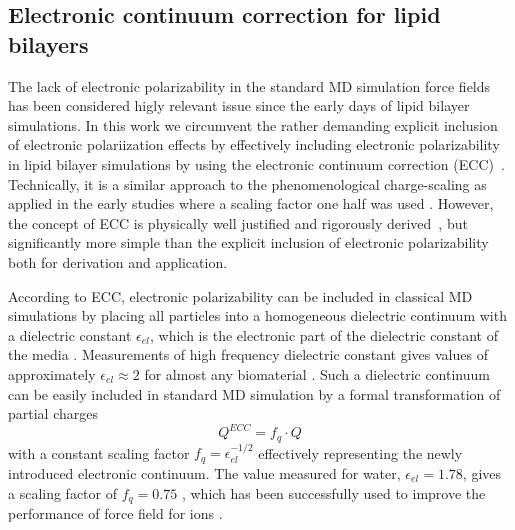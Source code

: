 \documentclass[aip,jcp,twocolumn]{revtex4}
\begin{document}
\subsection{Electronic continuum correction for lipid bilayers}
The lack of electronic polarizability in the standard MD simulation
force fields has been considered higly relevant issue since the early days of
lipid bilayer simulations.
In this work we circumvent the rather demanding explicit inclusion
of electronic polariization effects \cite{chowdhary13} by effectively including
electronic polarizability in lipid
bilayer simulations by using the electronic continuum correction
(ECC)~\cite{leontyev11}. 
Technically, it is a similar approach to the phenomenological charge-scaling as applied in 
the early studies where a scaling factor one half was used \cite{jonsson86,egberts94}. 
However, the concept of ECC is 
physically well justified and rigorously derived~\cite{leontyev09, leontyev10, leontyev11},
but significantly more simple than the explicit inclusion of electronic
polarizability \cite{chowdhary13} both for derivation and application.


According to ECC, electronic
polarizability can be included in classical MD simulations by
placing all particles into a homogeneous dielectric continuum 
with a dielectric constant $\epsilon _{el}$, 
which is the electronic part of the dielectric constant of 
the media \cite{leontyev11}. Measurements of high frequency 
dielectric constant gives values of approximately $\epsilon _{el} \approx 2$ 
for almost any biomaterial \cite{some_original_work, leontyev11}.
Such a dielectric continuum can be easily included in standard MD simulation by
a formal transformation of partial charges 
\begin{equation}
  Q^{ECC} = f_q \cdot Q
\end{equation}
with a constant scaling factor $f_q = \epsilon _{el} ^{-1/2}$ 
effectively representing the newly introduced electronic continuum. 
The value measured for water, $\epsilon _{el} = 1.78$, gives 
a scaling factor of $f_q = 0.75$ \cite{some_orig_source, leontyev11}, which has been
successfully used to improve the performance of force field for ions \cite{kohagen14,kohagen16,??}. 
\end{document}

